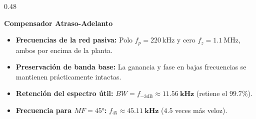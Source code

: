 \begin{frame}
\begin{columns}[t, onlytextwidth]
    \begin{column}{0.48\textwidth}
      \begin{tarjeta}[colframe=BlueAccent]
        {\fontsize{9pt}{11pt}\selectfont \textbf{\color{BlueAccent} Compensador Atraso-Adelanto}}\\[2pt]
        {\fontsize{7.5pt}{9.2pt}\selectfont
        \begin{itemize}\setlength{\itemsep}{2.5pt}
          \item \textbf{Frecuencias de la red pasiva:}
          Polo $f_p = \qty{220}{\kilo\hertz}$ y cero $f_z = \qty{1.1}{\mega\hertz}$, ambos por encima de la planta.
          \item \textbf{Preservación de banda base:}
          La ganancia y fase en bajas frecuencias se mantienen prácticamente intactas.
          \item \textbf{Retención del espectro útil:}
          $BW = f_{-3\text{dB}} \approx \mathbf{\qty{11.56}{\kilo\hertz}}$ (retiene el $\mathbf{99.7\%}$).
          \item \textbf{Frecuencia para $MF = \ang{45}$:}
          $f_{45} \approx \mathbf{\qty{45.11}{\kilo\hertz}}$ ($4.5$ veces más veloz).
        \end{itemize}
        }
      \end{tarjeta}
    \end{column}
  \end{columns}
\end{frame}

